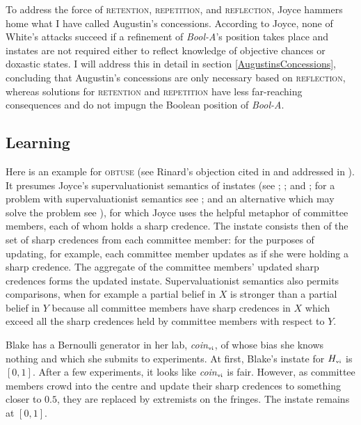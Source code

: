 \documentclass[11pt]{article}
\newcommand{\anderson}[0]{\textit{Bool-A}}
\begin{document}
To address the force of \textsc{retention}, \textsc{repetition}, and
\textsc{reflection}, Joyce hammers home what I have called Augustin's
concessions. According to Joyce, none of White's attacks succeed if a
refinement of {\anderson}'s position takes place and instates are not
required either to reflect knowledge of objective chances or doxastic
states. I will address this in detail in section
\ref{AugustinsConcessions}, concluding that Augustin's concessions are
only necessary based on \textsc{reflection}, whereas solutions for
\textsc{retention} and \textsc{repetition} have less far-reaching
consequences and do not impugn the Boolean position of {\anderson}.

\subsection{Learning}
\label{learning}

Here is an example for \textsc{obtuse} (see Rinard's objection cited
in  and addressed in ).
It presumes Joyce's supervaluationist semantics of instates (see
; ; and
; for a problem with supervaluationist semantics
see ; and an alternative which may solve the
problem see ), for which Joyce uses the
helpful metaphor of committee members, each of whom holds a sharp
credence. The instate consists then of the set of sharp credences from
each committee member: for the purposes of updating, for example, each
committee member updates as if she were holding a sharp credence. The
aggregate of the committee members' updated sharp credences forms the
updated instate. Supervaluationist semantics also permits comparisons,
when for example a partial belief in $X$ is stronger than a partial
belief in $Y$ because all committee members have sharp credences in
$X$ which exceed all the sharp credences held by committee members
with respect to $Y$.

\begin{quotex}
  \label{ex:learning} Blake has a Bernoulli
  generator in her lab, \textit{coin}$_{\mbox{\tiny{vi}}}$, of whose
  bias she knows nothing and which she submits to experiments. At first,
  Blake's instate for $H_{\mbox{\tiny{vi}}}$ is $[0,1]$. After a few
  experiments, it looks like \textit{coin}$_{\mbox{\tiny{vi}}}$ is
  fair. However, as committee members crowd into the centre and update
  their sharp credences to something closer to $0.5$, they are
  replaced by extremists on the fringes. The instate remains at
  $[0,1]$. 
\end{quotex}
\end{document}
